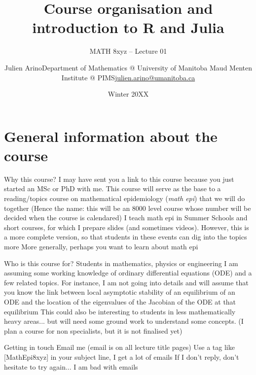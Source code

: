 \documentclass[aspectratio=169]{beamer}\usepackage[]{graphicx}\usepackage[]{xcolor}
\subtitle{MATH 8xyz -- Lecture 01}
\author{\texorpdfstring{Julien Arino\newline Department of Mathematics @ University of Manitoba \newline Maud Menten Institute @ PIMS\newline\url{julien.arino@umanitoba.ca}}{Julien Arino}}
\date{Winter 20XX}
\title{Course organisation and introduction to R and Julia}
\begin{document}

\section{General information about the course}

\begin{frame}{Why this course?}
\bbullet I may have sent you a link to this course because you just started an MSc or PhD with me. This course will serve as the base to a reading/topics course on mathematical epidemiology (\emph{math epi}) that we will do together
\vfill
(Hence the name: this will be an 8000 level course whose number will be decided when the course is calendared)
\vfill
\bbullet I teach math epi in Summer Schools and short courses, for which I prepare slides (and sometimes videos). However, this is a more complete version, so that students in these events can dig into the topics more
\vfill
\bbullet More generally, perhaps you want to learn about math epi
\end{frame}

\begin{frame}{Who is this course for?}
\bbullet Students in mathematics, physics or engineering
\vfill
\bbullet I am assuming some working knowledge of ordinary differential equations (ODE) and a few related topics. For instance, I am not going into details and will assume that you know the link between local asymptotic stability of an equilibrium of an ODE and the location of the eigenvalues of the Jacobian of the ODE at that equilibrium
\vfill
\bbullet This could also be interesting to students in less mathematically heavy areas... but will need some ground work to understand some concepts. (I plan a course for non specialists, but it is not finalised yet)
\end{frame}

\begin{frame}{Getting in touch}
Email me (email is on all lecture title pages)
\vfill
Use a tag like [MathEpi8xyz] in your subject line, I get a lot of emails
\vfill
If I don't reply, don't hesitate to try again... I am bad with emails
\end{frame} 
\end{document}
